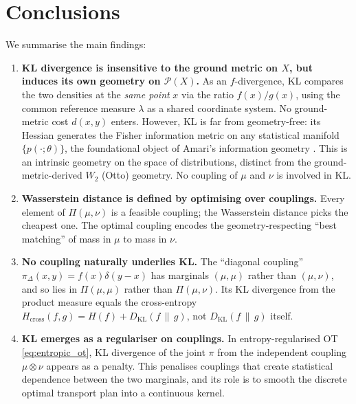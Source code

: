 \documentclass[12pt]{article}
\newcommand{\KL}[2]{D_{\mathrm{KL}}\!\left(#1\,\|\,#2\right)}
\newcommand{\calP}{\mathcal{P}}
\begin{document}
\section{Conclusions}

We summarise the main findings:

\begin{enumerate}
  \item \textbf{KL divergence is insensitive to the ground metric on $X$,
    but induces its own geometry on $\calP(X)$.}
    As an $f$-divergence, KL compares the two densities at the
    \emph{same point} $x$ via the ratio $f(x)/g(x)$, using the
    common reference measure $\lambda$ as a shared coordinate system.
    No ground-metric cost $d(x,y)$ enters.  However, KL is far
    from geometry-free: its Hessian generates the Fisher information
    metric on any statistical manifold
    $\{p(\cdot;\theta)\}$, the foundational object of Amari's
    information geometry \citep{Amari2016,AmariNagaoka2000}.  This
    is an intrinsic geometry on the space of distributions,
    distinct from the ground-metric-derived $W_2$ (Otto) geometry.
    No coupling of $\mu$ and $\nu$ is involved in KL.

  \item \textbf{Wasserstein distance is defined by optimising
    over couplings.}  Every element of $\Pi(\mu,\nu)$ is a
    feasible coupling; the Wasserstein distance picks the
    cheapest one.  The optimal coupling encodes the
    geometry-respecting ``best matching'' of mass in $\mu$ to
    mass in $\nu$.

  \item \textbf{No coupling naturally underlies KL.}  The
    ``diagonal coupling'' $\pi_\Delta(x,y) = f(x)\delta(y-x)$
    has marginals $(\mu,\mu)$ rather than $(\mu,\nu)$, and so
    lies in $\Pi(\mu,\mu)$ rather than $\Pi(\mu,\nu)$.  Its
    KL divergence from the product measure equals the
    cross-entropy $H_{\mathrm{cross}}(f,g) = H(f) + \KL{f}{g}$,
    not $\KL{f}{g}$ itself.

  \item \textbf{KL emerges as a regulariser on couplings.}
    In entropy-regularised OT \eqref{eq:entropic_ot}, KL
    divergence of the joint $\pi$ from the independent coupling
    $\mu\otimes\nu$ appears as a penalty.  This penalises
    couplings that create statistical dependence between the
    two marginals, and its role is to smooth the discrete
    optimal transport plan into a continuous kernel.


\end{enumerate}
\end{document}
